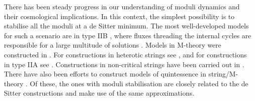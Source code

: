 \documentclass[11pt,a4paper]{article}
\begin{document}

There has been steady progress in our understanding of moduli dynamics and their cosmological implications. In this context, the simplest possibility is to  stabilise  all the moduli at a de Sitter minimum. The most well-developed models for such a scenario are in type IIB \cite{Kachru:2003aw, Denef:2004dm, Denef:2005mm, Lust:2005dy, Lust:2006zg, Balasubramanian:2005zx, Cicoli:2013cha, Westphal:2006tn, Louis:2012nb, Rummel:2011cd, Braun:2015pza, Gallego:2017dvd}, where fluxes threading the internal cycles are responsible for a large multitude of solutions \cite{Dasgupta:1999ss, Gukov:1999ya, Bousso:2000xa, Feng:2000if, Giddings:2001yu}. Models in M-theory  were constructed in \cite{Acharya:2006ia}.  For constructions in heterotic strings see \cite{het}, and for constructions in type IIA see \cite{typeIIa}. Constructions in  non-critical strings  have been carried out in \cite{Maloney:2002rr}. There have also been efforts to construct models of quintessence in string/M-theory \cite{Choi:1999xn, Kaloper:2008qs, Panda:2010uq, Cicoli:2012tz, Olguin-Tejo:2018pfq}. Of these, the ones with moduli stabilisation are closely related to the de Sitter constructions and make use of the same approximations. 
\end{document}
